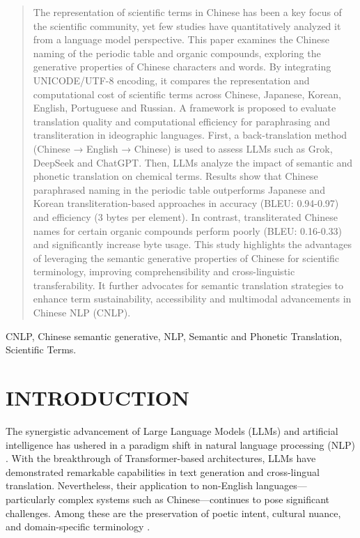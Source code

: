 \documentclass[conference]{IEEEtran}
\begin{document}
\begin{CJK*}{UTF8}{gbsn}
\begin{abstract}
The representation of scientific terms in Chinese has been a key focus of the scientific community, yet few studies have quantitatively analyzed it from a language model perspective. This paper examines the Chinese naming of the periodic table and organic compounds, exploring the generative properties of Chinese characters and words. By integrating UNICODE/UTF-8 encoding, it compares the representation and computational cost of scientific terms across Chinese, Japanese, Korean, English, Portuguese and Russian. A framework is proposed to evaluate translation quality and computational efficiency for paraphrasing and transliteration in ideographic languages. First, a back-translation method (Chinese → English → Chinese) is used to assess LLMs such as Grok, DeepSeek and ChatGPT. Then, LLMs analyze the impact of semantic and phonetic translation on chemical terms. Results show that Chinese paraphrased naming in the periodic table outperforms Japanese and Korean transliteration-based approaches in accuracy (BLEU: 0.94-0.97) and efficiency (3 bytes per element). In contrast, transliterated Chinese names for certain organic compounds perform poorly (BLEU: 0.16-0.33) and significantly increase byte usage. This study highlights the advantages of leveraging the semantic generative properties of Chinese for scientific terminology, improving comprehensibility and cross-linguistic transferability. It further advocates for semantic translation strategies to enhance term sustainability, accessibility and multimodal advancements in Chinese NLP (CNLP).
\end{abstract}

\begin{IEEEkeywords}
CNLP, Chinese semantic generative, NLP, Semantic and Phonetic Translation, Scientific Terms.
\end{IEEEkeywords}
\section{INTRODUCTION}

The synergistic advancement of Large Language Models (LLMs) and artificial intelligence has ushered in a paradigm shift in natural language processing (NLP) \citep{vaswani2017attention}. With the breakthrough of Transformer-based architectures, LLMs have demonstrated remarkable capabilities in text generation and cross-lingual translation. Nevertheless, their application to non-English languages—particularly complex systems such as Chinese—continues to pose significant challenges. Among these are the preservation of poetic intent, cultural nuance, and domain-specific terminology \citep{zhang2021study, zhong2024beyond}.


\end{CJK*}
\end{document}
